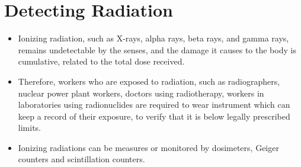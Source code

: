 \documentclass[12pt]{book}
\begin{document}


\chapter{Detecting Radiation}
\begin{itemize}
	\item
Ionizing radiation, such as X-rays, alpha rays, beta rays, and gamma
rays, remains undetectable by the senses, and the damage it causes
to the body is cumulative, related to the total dose received.
\item Therefore,
workers who are exposed to radiation, such as radiographers, nuclear
power plant workers, doctors using radiotherapy, workers in
laboratories using radionuclides are
required to wear instrument which can keep a record of their exposure,
to verify that it is below legally prescribed limits.
 \item Ionizing radiations
can be measures or monitored by dosimeters, Geiger counters and
scintillation counters.
\end{itemize}


\end{document}
